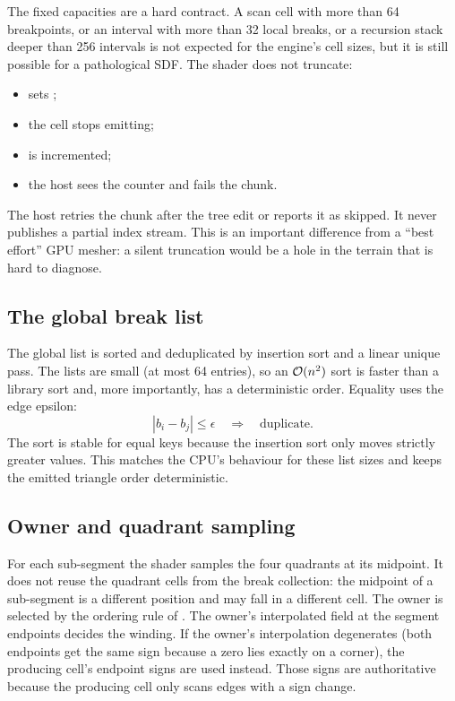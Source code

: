 The fixed capacities are a hard contract.  A scan cell with more than 64
breakpoints, or an interval with more than 32 local breaks, or a recursion
stack deeper than 256 intervals is not expected for the engine's cell
sizes, but it is still possible for a pathological SDF.  The shader does
not truncate:
\begin{itemize}
\item {} sets ;
\item the cell stops emitting;
\item {} is incremented;
\item the host sees the counter and fails the chunk.
\end{itemize}
The host retries the chunk after the tree edit or reports it as skipped.
It never publishes a partial index stream.  This is an important
difference from a ``best effort'' GPU mesher: a silent truncation would be
a hole in the terrain that is hard to diagnose.

\subsection{The global break list}

The global list is sorted and deduplicated by insertion sort and a linear
unique pass.  The lists are small (at most 64 entries), so an $\mathcal{O}(n^2)$
sort is faster than a library sort and, more importantly, has a
deterministic order.  Equality uses the edge epsilon:
\begin{equation}
  |b_i-b_j|\le \epsilon \quad\Rightarrow\quad \text{duplicate}.
\end{equation}
The sort is stable for equal keys because the insertion sort only moves
strictly greater values.  This matches the CPU's  behaviour
for these list sizes and keeps the emitted triangle order deterministic.

\subsection{Owner and quadrant sampling}

For each sub-segment the shader samples the four quadrants at its
midpoint.  It does not reuse the quadrant cells from the break collection:
the midpoint of a sub-segment is a different position and may fall in a
different cell.  The owner is selected by the ordering rule of
.  The owner's interpolated field at the segment
endpoints decides the winding.  If the owner's interpolation degenerates
(both endpoints get the same sign because a zero lies exactly on a corner),
the producing cell's endpoint signs are used instead.  Those signs are
authoritative because the producing cell only scans edges with a sign
change.

